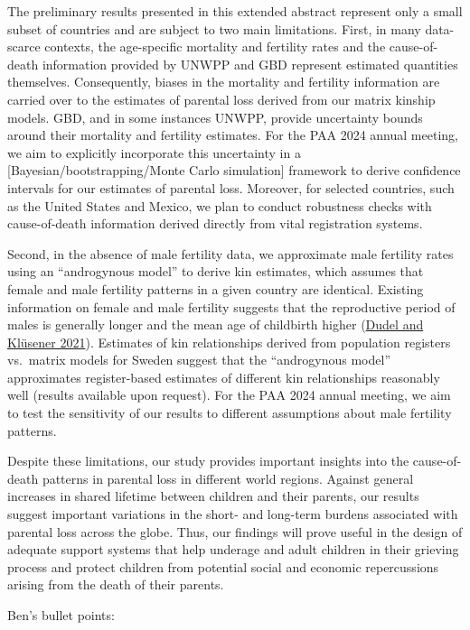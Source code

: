\documentclass[
  11pt,
  letterpaper,
]{article}
\begin{document}
The preliminary results presented in this extended abstract represent only a small subset of countries and are subject to two main limitations. First, in many data-scarce contexts, the age-specific mortality and fertility rates and the cause-of-death information provided by UNWPP and GBD represent estimated quantities themselves. Consequently, biases in the mortality and fertility information are carried over to the estimates of parental loss derived from our matrix kinship models. GBD, and in some instances UNWPP, provide uncertainty bounds around their mortality and fertility estimates. For the PAA 2024 annual meeting, we aim to explicitly incorporate this uncertainty in a {[}Bayesian/bootstrapping/Monte Carlo simulation{]} framework to derive confidence intervals for our estimates of parental loss. Moreover, for selected countries, such as the United States and Mexico, we plan to conduct robustness checks with cause-of-death information derived directly from vital registration systems.

Second, in the absence of male fertility data, we approximate male fertility rates using an ``androgynous model'' to derive kin estimates, which assumes that female and male fertility patterns in a given country are identical. Existing information on female and male fertility suggests that the reproductive period of males is generally longer and the mean age of childbirth higher (\protect\hyperlink{ref-dudel2021fertility}{Dudel and Klüsener 2021}). Estimates of kin relationships derived from population registers vs.~matrix models for Sweden suggest that the ``androgynous model'' approximates register-based estimates of different kin relationships reasonably well (results available upon request). For the PAA 2024 annual meeting, we aim to test the sensitivity of our results to different assumptions about male fertility patterns.

Despite these limitations, our study provides important insights into the cause-of-death patterns in parental loss in different world regions. Against general increases in shared lifetime between children and their parents, our results suggest important variations in the short- and long-term burdens associated with parental loss across the globe. Thus, our findings will prove useful in the design of adequate support systems that help underage and adult children in their grieving process and protect children from potential social and economic repercussions arising from the death of their parents.

Ben's bullet points:
\end{document}
